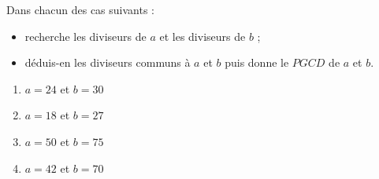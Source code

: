 
Dans chacun des cas suivants :
\begin{itemize}
\item recherche les diviseurs de $a$ et les diviseurs de $b$ ;
\item déduis-en les diviseurs communs à $a$ et $b$ puis donne le $PGCD$ de $a$ et $b$.
\end{itemize}
\begin{enumerate}
\item $a=24$ et $b=30$
\item $a=18$ et $b=27$
\item $a=50$ et $b=75$
\item $a=42$ et $b=70$
\end{enumerate}
